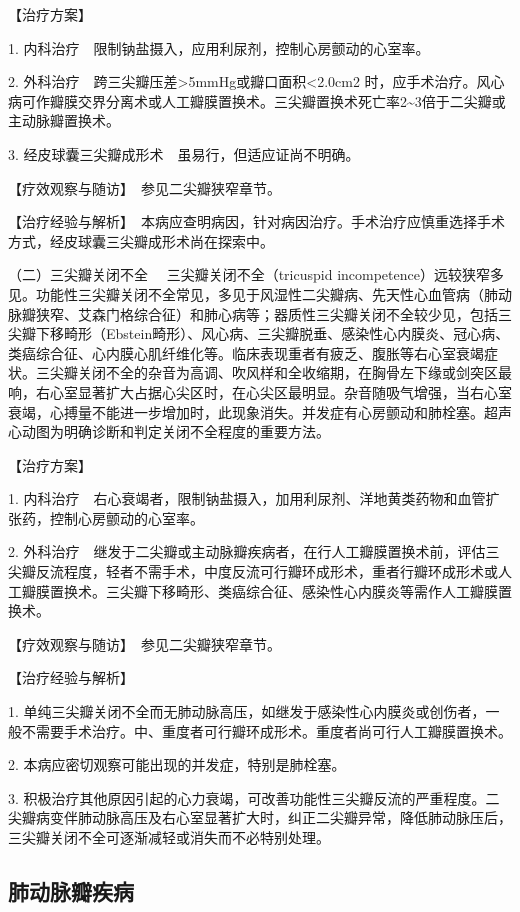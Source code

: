 【治疗方案】

1. 内科治疗　限制钠盐摄入，应用利尿剂，控制心房颤动的心室率。

2.
外科治疗　跨三尖瓣压差\textgreater{}5mmHg或瓣口面积\textless{}2.0cm{2}
时，应手术治疗。风心病可作瓣膜交界分离术或人工瓣膜置换术。三尖瓣置换术死亡率2\textasciitilde{}3倍于二尖瓣或主动脉瓣置换术。

3. 经皮球囊三尖瓣成形术　虽易行，但适应证尚不明确。

【疗效观察与随访】　参见二尖瓣狭窄章节。

【治疗经验与解析】　本病应查明病因，针对病因治疗。手术治疗应慎重选择手术方式，经皮球囊三尖瓣成形术尚在探索中。

{（二）三尖瓣关闭不全} 　三尖瓣关闭不全（tricuspid
incompetence）远较狭窄多见。功能性三尖瓣关闭不全常见，多见于风湿性二尖瓣病、先天性心血管病（肺动脉瓣狭窄、艾森门格综合征）和肺心病等；器质性三尖瓣关闭不全较少见，包括三尖瓣下移畸形（Ebstein畸形）、风心病、三尖瓣脱垂、感染性心内膜炎、冠心病、类癌综合征、心内膜心肌纤维化等。临床表现重者有疲乏、腹胀等右心室衰竭症状。三尖瓣关闭不全的杂音为高调、吹风样和全收缩期，在胸骨左下缘或剑突区最响，右心室显著扩大占据心尖区时，在心尖区最明显。杂音随吸气增强，当右心室衰竭，心搏量不能进一步增加时，此现象消失。并发症有心房颤动和肺栓塞。超声心动图为明确诊断和判定关闭不全程度的重要方法。

【治疗方案】

1.
内科治疗　右心衰竭者，限制钠盐摄入，加用利尿剂、洋地黄类药物和血管扩张药，控制心房颤动的心室率。

2.
外科治疗　继发于二尖瓣或主动脉瓣疾病者，在行人工瓣膜置换术前，评估三尖瓣反流程度，轻者不需手术，中度反流可行瓣环成形术，重者行瓣环成形术或人工瓣膜置换术。三尖瓣下移畸形、类癌综合征、感染性心内膜炎等需作人工瓣膜置换术。

【疗效观察与随访】　参见二尖瓣狭窄章节。

【治疗经验与解析】

1.
单纯三尖瓣关闭不全而无肺动脉高压，如继发于感染性心内膜炎或创伤者，一般不需要手术治疗。中、重度者可行瓣环成形术。重度者尚可行人工瓣膜置换术。

2. 本病应密切观察可能出现的并发症，特别是肺栓塞。

3.
积极治疗其他原因引起的心力衰竭，可改善功能性三尖瓣反流的严重程度。二尖瓣病变伴肺动脉高压及右心室显著扩大时，纠正二尖瓣异常，降低肺动脉压后，三尖瓣关闭不全可逐渐减轻或消失而不必特别处理。

\subsection{肺动脉瓣疾病}

